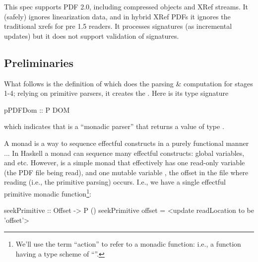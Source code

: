 
This spec supports PDF 2.0, including compressed objects and XRef streams.
%
It (safely) ignores linearization data, and in hybrid XRef PDFs
it ignores the traditional xrefs for pre 1.5 readers.
It processes signatures (as incremental updates) but it does not support
validation of signatures.



\subsection{Preliminaries}
\iffalse
\begin{code}
{-# LANGUAGE EmptyDataDecls, TypeOperators, LambdaCase #-}
module Spec where
import           Control.Monad
import           Data.Char
import           Data.Foldable(foldlM)
import qualified Data.IntSet as IntSet
import           Data.List
import qualified Data.Map as M
import           Data.Map(Map)
import           Types
import           Utils
import           Primitives
import           Streams
\end{code}
\fi


What follows is the definition of  which does the
parsing \& computation for stages 1-4;
relying on primitive parsers, it creates the .
Here is its type signature
\begin{codeNoExecute}
pPDFDom :: P DOM
\end{codeNoExecute}
which indicates that
 is a ``monadic parser''  that returns a
value of type .

A monad is a way to sequence effectful constructs in a purely
functional manner ... 
In Haskell a monad can sequence many effectful constructs: global variables,
and etc. However,  is a simple monad that effectively has one
read-only variable (the PDF file being read), and one mutable variable
\rdloc{}, the offset in the file where reading (i.e., the primitive parsing)
occurs.
I.e., we have
a single effectful primitive monadic function\footnote{
  We'll use the term ``action'' to refer to a monadic function:
  i.e., a function having a type scheme of ``''.
}:
\begin{codeNoExecute}
    seekPrimitive :: Offset -> P ()
    seekPrimitive offset = <update readLocation to be 'offset'>
\end{codeNoExecute}

